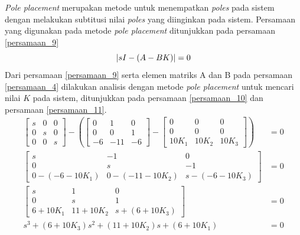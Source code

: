 \documentclass[../main.tex]{subfiles}
\begin{document}
                \textit{Pole placement} merupakan metode untuk menempatkan \textit{poles} pada sistem dengan melakukan subtitusi nilai \textit{poles} yang diinginkan pada sistem. Persamaan yang digunakan pada metode \textit{pole placement} ditunjukkan pada persamaan \eqref{persamaan_9}
                \begin{equation}
                    \left| sI - (A-BK) \right| =0 \\[5pt]
                    \label{persamaan_9}
                \end{equation}
                Dari persamaan \eqref{persamaan_9} serta elemen matriks A dan B pada persamaan \eqref{persamaan_4} dilakukan analisis dengan metode \textit{pole placement} untuk mencari nilai $K$ pada sistem, ditunjukkan pada persamaan \eqref{persamaan_10} dan persamaan \eqref{persamaan_11}.
                \begin{equation}
                    \begin{split}
                        \begin{bmatrix} s & 0 & 0 \\ 0 & s & 0 \\ 0 & 0 & s \end{bmatrix} - \left( \begin{bmatrix}0 & 1 & 0 \\ 0 & 0 & 1 \\ -6 & -11 & -6\end{bmatrix} - \begin{bmatrix}0 & 0 & 0 \\ 0 & 0 & 0 \\ 10K_1 & 10K_2 & 10K_3\end{bmatrix} \right) &= 0 \\[5pt]
                        \begin{bmatrix} s & -1 & 0 \\ 0 & s & -1 \\ 0-(-6-10K_1) & 0-(-11-10K_2) & s-(-6-10K_3) \end{bmatrix} &= 0 \\[5pt]
                        \begin{bmatrix} s & 1 & 0 \\ 0 & s & 1 \\ 6+10K_1 & 11+10K_2 & s+(6+10K_3) \end{bmatrix} &= 0 \\[10pt]
                        s^3 + (6+10K_3)s^2 + (11+10K_2)s + (6+10K_1) &=0\\[5pt]
                        \label{persamaan_10}
                    \end{split}
                \end{equation}
\end{document}

